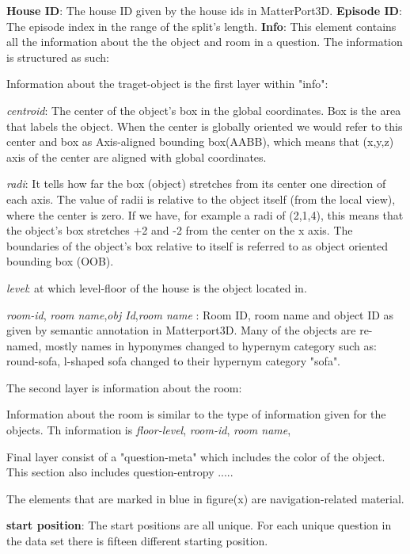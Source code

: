 \textbf{House ID}: The house ID given by the house ids in MatterPort3D.
\textbf{Episode ID}: The episode index in the range of the split's length. \hspace{1.5cm}
\textbf{Info}: This element contains all the information about the the object and room in a question. The information is structured as such: 

Information about the traget-object is the first layer within "info": 

\textit{centroid}: The center of the object's box in the global coordinates. Box is the area that labels  the object. When the center is globally oriented we would refer to this center and box as Axis-aligned bounding box(AABB), which means that (x,y,z) axis of the center are aligned with global coordinates. 

\textit{radi}: It tells how far the box (object) stretches from its center one direction of each axis. The value of radii is relative to the object itself (from the local view), where the center is zero. If we have, for example a radi of (2,1,4), this means that the object's box stretches +2 and -2 from the center on the x axis. The boundaries of the object's box relative to itself is referred to as object oriented bounding box (OOB). 

\textit{level}: at which level-floor of the house  is the object located in. 

\textit{room-id}, \textit{room name},\textit{obj Id},\textit{room name} : Room ID, room name and object ID as given by semantic annotation in  Matterport3D. Many of the objects are re-named, mostly names in hyponymes changed to hypernym category such as: round-sofa, l-shaped sofa changed to their hypernym category "sofa". 

The second layer is information about the room: 

Information about the room is similar to the type of information given for the objects. Th information is \textit{floor-level}, \textit{room-id}, \textit{room name},

Final layer consist of a "question-meta" which includes the color of the object. This section also includes question-entropy ..... 

The elements that are marked in blue in figure(x) are navigation-related material. 

\textbf{start position}: The start positions are all unique. For each unique question in the data set there is fifteen different starting position. 

